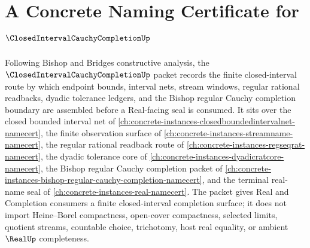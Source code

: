 \chapter{A Concrete Naming Certificate for $\ClosedIntervalCauchyCompletionUp$}
\label{ch:concrete-instances-closed-interval-cauchy-completion-namecert}

Following Bishop and Bridges constructive analysis, the $\ClosedIntervalCauchyCompletionUp$ packet records the finite closed-interval route by which endpoint bounds, interval nets, stream windows, regular rational readbacks, dyadic tolerance ledgers, and the Bishop regular Cauchy completion boundary are assembled before a Real-facing seal is consumed. It sits over the closed bounded interval net of \autoref{ch:concrete-instances-closedboundedintervalnet-namecert}, the finite observation surface of \autoref{ch:concrete-instances-streamname-namecert}, the regular rational readback route of \autoref{ch:concrete-instances-regseqrat-namecert}, the dyadic tolerance core of \autoref{ch:concrete-instances-dyadicratcore-namecert}, the Bishop regular Cauchy completion packet of \autoref{ch:concrete-instances-bishop-regular-cauchy-completion-namecert}, and the terminal real-name seal of \autoref{ch:concrete-instances-real-namecert}. The packet gives Real and Completion consumers a finite closed-interval completion surface; it does not import Heine--Borel compactness, open-cover compactness, selected limits, quotient streams, countable choice, trichotomy, host real equality, or ambient $\RealUp$ completeness.


